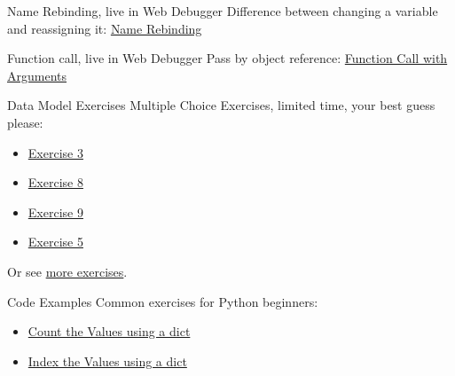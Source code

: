 \documentclass[10pt, colorlinks=true, urlcolor=blue]{beamer}
\begin{document}
\begin{frame}[fragile]{Name Rebinding, live in Web Debugger}
  Difference between changing a variable and reassigning it:
  \href{https://memory-graph.com/#code=%0Aa+%3D+%5B4%2C+3%2C+2%5D%0Ab+%3D+a%0A%0Ab+%2B%3D+%5B1%5D++++++++%23+changing+%27b%27+changes+%27a%27%0Ab+%3D+%5B100%2C+200%5D++%23+but+reassignment+rebinds+%27b%27+to+another+value%2C+%27a%27+is+uneffected%0A}{Name Rebinding}
\end{frame}

\begin{frame}[fragile]{Function call, live in Web Debugger}
  Pass by object reference:
  \href{https://memory-graph.com/#codeurl=https://raw.githubusercontent.com/bterwijn/memory_graph/refs/heads/main/src/function_call.py}{Function Call with Arguments}
\end{frame}

\begin{frame}{Data Model Exercises}
  Multiple Choice Exercises, limited time, your best guess please:
  \begin{itemize}
  \item \href{https://memory-graph.com/\#codeurl=https://raw.githubusercontent.com/bterwijn/memory_graph_videos/refs/heads/main/exercises/exercise3.py}{Exercise 3}
  \item \href{https://memory-graph.com/\#codeurl=https://raw.githubusercontent.com/bterwijn/memory_graph_videos/refs/heads/main/exercises/exercise8.py}{Exercise 8}
  \item \href{https://memory-graph.com/\#codeurl=https://raw.githubusercontent.com/bterwijn/memory_graph_videos/refs/heads/main/exercises/exercise9.py}{Exercise 9}
  \item \href{https://memory-graph.com/\#codeurl=https://raw.githubusercontent.com/bterwijn/memory_graph_videos/refs/heads/main/exercises/exercise5.py}{Exercise 5}
  \end{itemize}
  \vspace{8mm}
  Or see \href{https://github.com/bterwijn/memory_graph_videos/blob/main/exercises/exercises.md}{more exercises}.
\end{frame}

\begin{frame}[fragile]{Code Examples}
  Common exercises for Python beginners:
  \begin{itemize}
  \item \href{https://memory-graph.com/#codeurl=https://raw.githubusercontent.com/bterwijn/memory_graph/refs/heads/main/src/value_counts.py}{Count the Values using a dict}
  \item \href{https://memory-graph.com/#codeurl=https://raw.githubusercontent.com/bterwijn/memory_graph/refs/heads/main/src/value_indices.py}{Index the Values using a dict}
  \end{itemize}
\end{frame}
\end{document}
